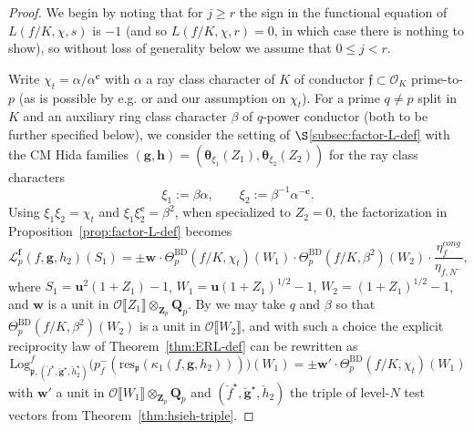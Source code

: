 \documentclass[10pt,letterpaper]{amsart}
\theoremstyle{plain}
\theoremstyle{definition}
\theoremstyle{definition}
\theoremstyle{plain}
\theoremstyle{plain}
\theoremstyle{plain}
\theoremstyle{remark}
\numberwithin{equation}{section}
\newcommand{\cc}{\mathbf{c}}
\newcommand{\ch}{\xi}
\newcommand{\pp}{\mathfrak{p}}
\newcommand{\fkf}{\mathfrak{f}}
\DeclareMathOperator{\BD}{BD} %
\def\cO{\mathcal O}
\newcommand{\unb}{{\boldsymbol{f}}}
\newcommand{\Q}{\mathbf{Q}}
\newcommand{\Z}{\mathbf{Z}}
\newcommand{\dBr}[1]{\llbracket{#1}\rrbracket}
\newcommand{\bfg}{{\boldsymbol{g}}}
\newcommand{\bfh}{{\boldsymbol{h}}}
\begin{document}
\begin{proof}
We begin by noting that for $j\geq r$ the sign in the functional equation of $L(f/K,\chi,s)$ is $-1$ (and so $L(f/K,\chi,r)=0$, in which case there is nothing to show),
so without loss of generality below we assume that $0\leq j<r$. 

Write $\chi_t=\alpha/\alpha^\cc$ with $\alpha$ a ray class character of $K$ of conductor $\fkf\subset\cO_K$ prime-to-$p$ (as is possible by e.g. \cite[Lem.\,6.9]{DR2} or \cite[Lem.\,5.31]{hida-HMI}  
and our assumption on $\chi_t$). For a prime $q\neq p$ split in $K$ and an auxiliary ring class character $\beta$ of $q$-power conductor (both to be further specified below), we consider the setting of $\S$\ref{subsec:factor-L-def} with the CM Hida families
$(\bfg,\bfh)=(\boldsymbol{\theta}_{\ch_1}(Z_1),\boldsymbol{\theta}_{\ch_2}(Z_2))$ for the ray class characters
\[
\ch_1:=\beta\alpha,\quad\quad\ch_2:=\beta^{-1}\alpha^{-\cc}.
\]
Using $\xi_1\xi_2=\chi_t$ and $\xi_1\xi_2^\cc=\beta^2$, when specialized to $Z_2=0$, the factorization in Proposition~\ref{prop:factor-L-def} becomes
\[
\mathscr{L}_p^{\unb}(f,\bfg,h_2)(S_1)=
\pm\mathbf{w}^{}\cdot\Theta_p^{\BD}(f/K,\chi_t)(W_1)\cdot\Theta_p^{\BD}(f/K,\beta^2)(W_2)\cdot\frac{\eta_{f}^{cong}}{\eta_{f,N^-}},
\]
where $S_1=\mathbf{u}^2(1+Z_1)-1$, $W_1=\mathbf{u}(1+Z_1)^{1/2}-1$, $W_2=(1+Z_1)^{1/2}-1$, and $\mathbf{w}$ is a unit in $\cO\dBr{Z_1}\otimes_{\Z_p}\Q_p$. 
By \cite[Thm.~D]{ChHs1} we may take $q$ and $\beta$ so that $\Theta_p^{\BD}(f/K,\beta^2)(W_2)$ is a unit in $\cO\dBr{W_2}$, and with such a choice the explicit reciprocity law of Theorem~\ref{thm:ERL-def} can be rewritten as
\[
{\mathrm{Log}}^f_{\pp,(\breve{f}^\star,\breve{\bfg}^\star,\breve{h}_2^\star)}\bigl(p_f^-({\mathrm{res}}_\pp(\kappa_1(f,\bfg,h_2)))\bigr)(W_1)=\pm\mathbf{w}'\cdot\Theta_p^{\BD}(f/K,\chi_t)(W_1)
\]
with $\mathbf{w}'$ a unit in $\cO\dBr{W_1}\otimes_{\Z_p}\Q_p$ and  $(\breve{f}^\star,\breve{\bfg}^\star,\breve{h}_2)$ the triple of level-$N$ test vectors from Theorem~\ref{thm:hsieh-triple}. 


\end{proof}
\end{document}
